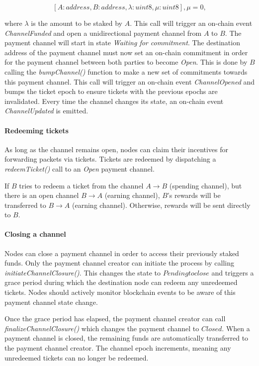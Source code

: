 $$[A: address, B: address, \lambda: uint8, \mu: uint8], \mu = 0,$$

where $\lambda$ is the amount to be staked by $A$. This call will trigger an on-chain event \textit{ChannelFunded}
and open a unidirectional payment channel from $A$ to $B$. The payment channel will start in state \textit{Waiting for commitment}. The destination address of the
payment channel must now set an on-chain commitment in order for the payment
channel between both parties to become \textit{Open}. This is done by $B$
calling the \textit{bumpChannel()} function to make a new set of commitments
towards this payment channel. This call will trigger an on-chain event
\textit{ChannelOpened} and bumps the ticket epoch to ensure tickets with the
previous epochs are invalidated. Every time the channel changes its state, an on-chain event \textit{ChannelUpdated} is emitted.

\paragraph{Redeeming tickets}
As long as the channel remains open, nodes can claim their incentives for
forwarding packets via tickets. Tickets are redeemed by dispatching a
\textit{redeemTicket()} call to an \textit{Open} payment channel.

If $B$ tries to redeem a ticket from the channel $A\rightarrow B$ (spending
channel), but there is an open channel $B\rightarrow A$ (earning channel),
$B$'s rewards will be transferred to $B\rightarrow A$ (earning channel).
Otherwise, rewards will be sent directly to $B$.

\paragraph{Closing a channel}
Nodes can close a payment channel in order to access their previously staked
funds. Only the payment channel creator can initiate the process by calling
\textit{initiateChannelClosure()}. This changes the state to $Pending to close$
and triggers a grace period during which the destination node can redeem
any unredeemed tickets. Nodes should actively monitor blockchain events to
be aware of this payment channel state change.

Once the grace period has elapsed, the payment channel creator can call
\textit{finalizeChannelClosure()} which changes the payment channel to
$Closed$. When a payment channel is closed, the remaining funds are automatically transferred
to the payment channel creator. The channel epoch increments, meaning any unredeemed tickets can no longer be redeemed.

